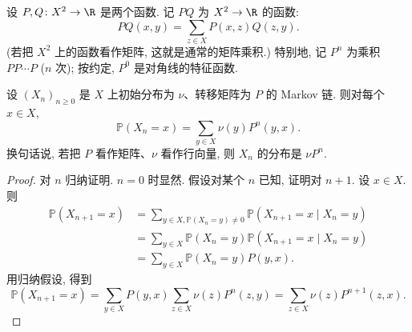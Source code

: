 设 $P, Q \colon X^2 \to \R$ 是两个函数. 记 $PQ$ 为 $X^2 \to \R$ 的函数:
\[
PQ(x, y) = \sum_{z \in X}P(x, z)Q(z, y).
\]
(若把 $X^2$ 上的函数看作矩阵, 这就是通常的矩阵乘积.)
特别地, 记 $P^n$ 为乘积 $PP\cdots P$ ($n$ 次); 按约定, $P^0$ 是对角线的特征函数.

\begin{lemma}[$X_n$ 的分布]
\label{lem:VI.1.4}
设 $(X_n)_{n \geq 0}$ 是 $X$ 上初始分布为 $\nu$、转移矩阵为 $P$ 的 Markov 链. 则对每个 $x \in X$,
\[
\mathbb{P}(X_n = x) = \sum_{y \in X}\nu(y)P^n(y, x).
\]
换句话说, 若把 $P$ 看作矩阵、$\nu$ 看作行向量, 则 $X_n$ 的分布是 $\nu P^n$.
\end{lemma}

\begin{proof}
对 $n$ 归纳证明. $n = 0$ 时显然. 假设对某个 $n$ 已知, 证明对 $n+1$. 设 $x \in X$. 则
\begin{align*}
\mathbb{P}(X_{n+1} = x) &= \sum_{y \in X, \mathbb{P}(X_n = y) \neq 0}\mathbb{P}(X_{n+1} = x \mid X_n = y) \\
&= \sum_{y \in X}\mathbb{P}(X_n = y)\mathbb{P}(X_{n+1} = x \mid X_n = y) \\
&= \sum_{y \in X}\mathbb{P}(X_n = y)P(y, x).
\end{align*}
用归纳假设, 得到
\[
\mathbb{P}(X_{n+1} = x) = \sum_{y \in X}P(y, x)\sum_{z \in X}\nu(z)P^n(z, y) = \sum_{z \in X}\nu(z)P^{n+1}(z, x).
\]
\end{proof}

